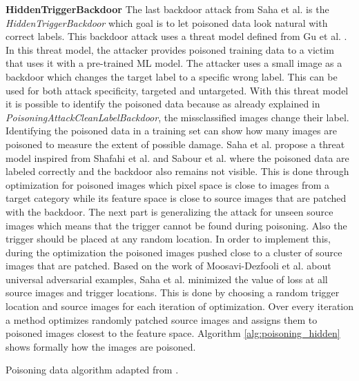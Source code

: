 \textbf{HiddenTriggerBackdoor} The last backdoor attack from Saha et al. \cite{DBLP:journals/corr/abs-1910-00033} is the \textit{HiddenTriggerBackdoor} which goal is to let poisoned data look natural with correct labels. This backdoor attack uses a threat model defined from Gu et al. \cite{DBLP:journals/corr/abs-1708-06733}. In this threat model, the attacker provides poisoned training data to a victim that uses it with a pre-trained ML model. The attacker uses a small image as a backdoor which changes the target label to a specific wrong label. This can be used for both attack specificity, targeted and untargeted. With this threat model it is possible to identify the poisoned data because as already explained in \textit{PoisoningAttackCleanLabelBackdoor}, the missclassified images change their label. Identifying the poisoned data in a training set can show how many images are poisoned to measure the extent of possible damage. Saha et al. propose a threat model inspired from Shafahi et al. \cite{DBLP:journals/corr/abs-1804-00792} and Sabour et al. \cite{DBLP:journals/corr/SabourCFF15} where the poisoned data are labeled correctly and the backdoor also remains not visible. This is done through optimization for poisoned images which pixel space is close to images from a target category while its feature space is close to source images that are patched with the backdoor. The next part is generalizing the attack for unseen source images which means that the trigger cannot be found during poisoning. Also the trigger should be placed at any random location. In order to implement this, during the optimization the poisoned images pushed close to a cluster of source images that are patched. Based on the work of Moosavi-Dezfooli et al. \cite{DBLP:conf/cvpr/Moosavi-Dezfooli17} about universal adversarial examples, Saha et al. minimized the value of loss at all source images and trigger locations. This is done by choosing a random trigger location and source images for each
iteration of optimization. Over every iteration a method optimizes randomly patched source images and assigns them to poisoned images closest to the feature space. Algorithm \ref{alg:poisoning_hidden} shows formally how the images are poisoned.

\begin{algorithm}
  \caption{Poisoning data algorithm adapted from \cite{DBLP:journals/corr/abs-1910-00033}.}
  \label{alg:poisoning_hidden}
\end{algorithm}

